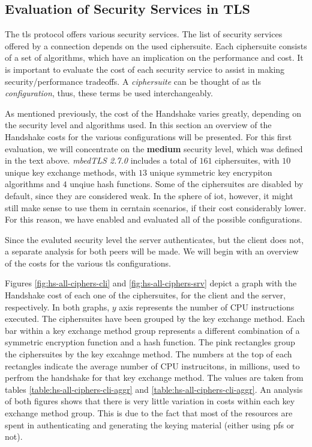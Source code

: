 \documentclass{llncs}
\begin{document}
\subsection{Evaluation of Security Services in TLS} \label{sec:ss-overview}

The \gls{tls} protocol offers various security services. The list of security services offered by a connection
depends on the used ciphersuite. Each ciphersuite consists of a set of algorithms, which have an implication 
on the performance and cost. It is important to evaluate the cost of each security service to assist in making
security/performance tradeoffs. A \textit{ciphersuite} can be thought of as \gls{tls} \textit{configuration},
thus, these terms be used interchangeably.

As mentioned previously, the cost of the Handshake varies greatly, depending on the security level and algorithms used.
In this section an overview of the Handshake costs for the various configurations will be presented. For this
first evaluation, we will concentrate on the \textbf{medium} security level, which was defined in the text above.
\textit{mbedTLS 2.7.0} includes a total of $161$ ciphersuites, with $10$ unique key exchange methods, with $13$ unique
symmetric key encrypiton algorithms and $4$ unqiue hash functions. Some of the ciphersuites are disabled by default,
since they are considered weak. In the sphere of \gls{iot}, however, it might still make sense to use them in cerntain
scenarios, if their cost considerably lower. For this reason, we have enabled and evaluated all of the possible configurations.

Since the evaluted security level the server authenticates, but the client does not,
a separate analysis for both peers will be made. We will begin with an overview of the costs for the various \gls{tls}
configurations.

Figures \ref{fig:hs-all-ciphers-cli} and \ref{fig:hs-all-ciphers-srv} depict a graph with the Handshake cost of each one 
of the ciphersuites, for the client and the server, respectively. In both graphs, $y$ axis represents the number of 
CPU instructions executed. The ciphersuites have been grouped by the key exchange method. Each bar within a key 
exchange method group represents a different combination of a symmetric encryption function and a hash function. 
The pink rectangles group the ciphersuites by the key excahnge method. The numbers at the top of each rectangles indicate the average 
number of CPU  instrucitons, in millions, used to perfrom the handshake for that key exchange method. The values are taken
from tables \ref{table:hs-all-ciphers-cli-aggr} and \ref{table:hs-all-ciphers-cli-aggr}.
An analysis of both figures shows that there is very little variation in costs within 
each key exchange method group. This is due to the fact that most of the resources are spent in authenticating and 
generating the keying material (either using \gls{pfs} or not).
\end{document}
